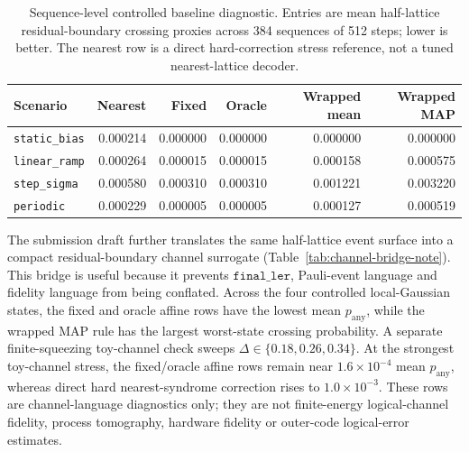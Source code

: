 \documentclass[11pt]{article}
\begin{document}
\begin{table}[ht]
\centering
\scriptsize
\begin{tabular}{lrrrrr}
\toprule
Scenario & Nearest & Fixed & Oracle & Wrapped mean & Wrapped MAP \\
\midrule
\texttt{static\_bias} & 0.000214 & 0.000000 & 0.000000 & 0.000000 & 0.000000 \\
\texttt{linear\_ramp} & 0.000264 & 0.000015 & 0.000015 & 0.000158 & 0.000575 \\
\texttt{step\_sigma} & 0.000580 & 0.000310 & 0.000310 & 0.001221 & 0.003220 \\
\texttt{periodic} & 0.000229 & 0.000005 & 0.000005 & 0.000127 & 0.000519 \\
\bottomrule
\end{tabular}
\caption{Sequence-level controlled baseline diagnostic.  Entries are mean
half-lattice residual-boundary crossing proxies across 384 sequences of 512
steps; lower is better.  The nearest row is a direct hard-correction stress
reference, not a tuned nearest-lattice decoder.}
\label{tab:sequence-baselines-note}
\end{table}

The submission draft further translates the same half-lattice event surface
into a compact residual-boundary channel surrogate
(Table~\ref{tab:channel-bridge-note}).  This bridge is useful because it
prevents \(\texttt{final\_ler}\), Pauli-event language and fidelity language
from being conflated.  Across the four controlled local-Gaussian states, the
fixed and oracle affine rows have the lowest mean \(p_{\mathrm{any}}\), while
the wrapped MAP rule has the largest worst-state crossing probability.  A
separate finite-squeezing toy-channel check sweeps
\(\Delta\in\{0.18,0.26,0.34\}\).  At the strongest toy-channel stress, the
fixed/oracle affine rows remain near \(1.6\times10^{-4}\) mean
\(p_{\mathrm{any}}\), whereas direct hard nearest-syndrome correction rises to
\(1.0\times10^{-3}\).  These rows are channel-language diagnostics only; they
are not finite-energy logical-channel fidelity, process tomography, hardware
fidelity or outer-code logical-error estimates.
\end{document}
